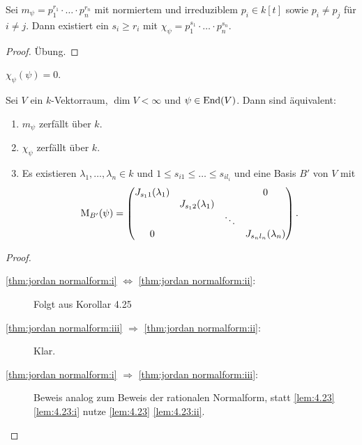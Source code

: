 \documentclass[12pt,a4paper]{scrartcl}
\theoremstyle{cplain}
\theoremstyle{cdef}
\begin{document}
\begin{kor}
	Sei $m_{\psi} = p_1^{r_1}\cdot\ldots\cdot p_n^{r_n}$ mit normiertem und irreduziblem $p_i\in k[t]$ sowie $p_i\neq p_j$ für $i\neq j$. Dann existiert ein $s_i\ge r_i$ mit $\chi_{\psi} = p_1^{s_1}\cdot\ldots\cdot p_n^{s_n}$.
\end{kor}
\begin{proof}
	Übung.
\end{proof}

\begin{kor}
	$\chi_{\psi}(\psi) = 0$.
\end{kor}

\begin{satz}
	Sei $V$ ein $k$-Vektorraum, $\dim V<\infty$ und $\psi\in\operatorname{End}(V)$. Dann sind äquivalent:
	\begin{enumerate}
		\item $m_{\psi}$ zerfällt über $k$. \label{thm:jordan normalform:i}
		\item $\chi_{\psi}$ zerfällt über $k$. \label{thm:jordan normalform:ii}
		\item Es existieren $\lambda_1,\dots, \lambda_n\in k$ und $1\leq s_{i1}\leq\dots\leq s_{il_i}$ und eine Basis $B'$ von $V$ mit
		\[\operatorname{M}_{B'}(\psi) = \begin{pmatrix}
		J_{s_11}(\lambda_1) &  &  & 0 \\ 
		& J_{s_12}(\lambda_1) &  &  \\ 
		&  & \ddots &  \\ 
		0 &  &  & J_{s_{n}l_n}(\lambda_n)
		\end{pmatrix}.\] \label{thm:jordan normalform:iii}
	\end{enumerate}
\end{satz}
\begin{proof}
	\leavevmode
	\begin{description}
		\item[\ref{thm:jordan normalform:i} $\Leftrightarrow$ \ref{thm:jordan normalform:ii}:] Folgt aus Korollar 4.25
		\item[\ref{thm:jordan normalform:iii} $\Rightarrow$ \ref{thm:jordan normalform:ii}:] Klar.
		\item[\ref{thm:jordan normalform:i} $\Rightarrow$ \ref{thm:jordan normalform:iii}:] Beweis analog zum Beweis der rationalen Normalform, statt \cref{lem:4.23} \ref{lem:4.23:i} nutze \cref{lem:4.23} \ref{lem:4.23:ii}.
		\qedhere
	\end{description}
\end{proof}
\end{document}
